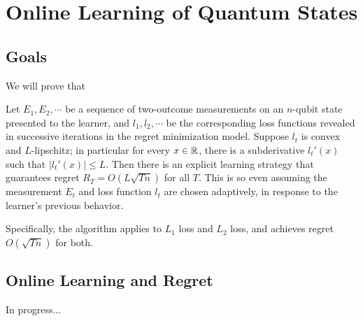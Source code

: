 \documentclass[main.tex]{subfiles}
\begin{document}
\section{Online Learning of Quantum States}

\subsection{Goals}

We will prove that

\begin{theorem}
	Let $E_1, E_2, \cdots$ be a sequence of two-outcome measurements on an $n$-qubit state presented to the learner, and $l_1, l_2, \cdots$ be the corresponding loss functions revealed in successive iterations in the regret minimization model. Suppose $l_t$ is convex and $L$-lipschitz; in particular for every $x \in \mathbb{R}$, there is a subderivative $l_t'(x)$ such that $| l_t'(x)| \leq L$. Then there is an explicit learning strategy that guarantees regret $R_T = O(L \sqrt{Tn})$ for all $T$. This is so even assuming the measurement $E_t$ and loss function $l_t$ are chosen adaptively, in response to the learner's previous behavior. 
	
	Specifically, the algorithm applies to $L_1$ loss and $L_2$ loss, and achieves regret $O(\sqrt{Tn})$ for both. 
\end{theorem}


\subsection{Online Learning and Regret}

In progress...
\end{document}
